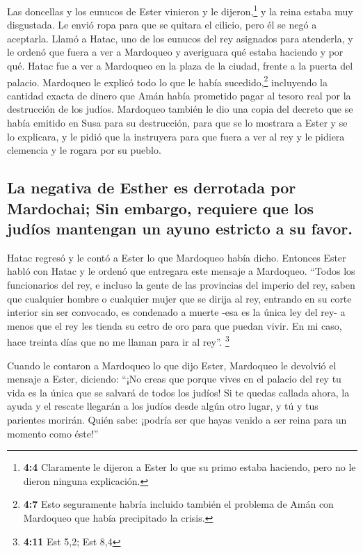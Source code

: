  Las doncellas y los eunucos de Ester vinieron y le
dijeron,\footnote{\textbf{4:4} Claramente le dijeron a Ester lo que su
  primo estaba haciendo, pero no le dieron ninguna explicación.} y la
reina estaba muy disgustada. Le envió ropa para que se quitara el
cilicio, pero él se negó a aceptarla.  Llamó a Hatac, uno
de los eunucos del rey asignados para atenderla, y le ordenó que fuera a
ver a Mardoqueo y averiguara qué estaba haciendo y por qué.
 Hatac fue a ver a Mardoqueo en la plaza de la ciudad,
frente a la puerta del palacio.  Mardoqueo le explicó todo
lo que le había sucedido,\footnote{\textbf{4:7} Esto seguramente habría
  incluido también el problema de Amán con Mardoqueo que había
  precipitado la crisis.} incluyendo la cantidad exacta de dinero que
Amán había prometido pagar al tesoro real por la destrucción de los
judíos.  Mardoqueo también le dio una copia del decreto
que se había emitido en Susa para su destrucción, para que se lo
mostrara a Ester y se lo explicara, y le pidió que la instruyera para
que fuera a ver al rey y le pidiera clemencia y le rogara por su pueblo.

\hypertarget{la-negativa-de-esther-es-derrotada-por-mardochai-sin-embargo-requiere-que-los-juduxedos-mantengan-un-ayuno-estricto-a-su-favor.}{%
\subsection{La negativa de Esther es derrotada por Mardochai; Sin
embargo, requiere que los judíos mantengan un ayuno estricto a su
favor.}\label{la-negativa-de-esther-es-derrotada-por-mardochai-sin-embargo-requiere-que-los-juduxedos-mantengan-un-ayuno-estricto-a-su-favor.}}

 Hatac regresó y le contó a Ester lo que Mardoqueo había
dicho.  Entonces Ester habló con Hatac y le ordenó que
entregara este mensaje a Mardoqueo.  ``Todos los
funcionarios del rey, e incluso la gente de las provincias del imperio
del rey, saben que cualquier hombre o cualquier mujer que se dirija al
rey, entrando en su corte interior sin ser convocado, es condenado a
muerte -esa es la única ley del rey- a menos que el rey les tienda su
cetro de oro para que puedan vivir. En mi caso, hace treinta días que no
me llaman para ir al rey''. \footnote{\textbf{4:11} Est 5,2; Est 8,4}

 Cuando le contaron a Mardoqueo lo que dijo Ester,
 Mardoqueo le devolvió el mensaje a Ester, diciendo:
``¡No creas que porque vives en el palacio del rey tu vida es la única
que se salvará de todos los judíos!  Si te quedas callada
ahora, la ayuda y el rescate llegarán a los judíos desde algún otro
lugar, y tú y tus parientes morirán. Quién sabe: ¡podría ser que hayas
venido a ser reina para un momento como éste!''

